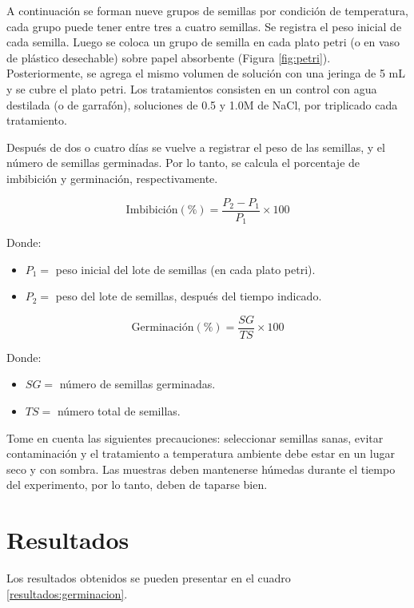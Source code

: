 A continuaci\'on se forman nueve grupos de semillas por condici\'on de temperatura, cada grupo puede tener entre tres a cuatro semillas. Se registra el peso inicial de cada semilla. Luego se coloca un grupo de semilla en cada plato petri (o en vaso de pl\'astico desechable) sobre papel absorbente (Figura \ref{fig:petri}). Posteriormente, se agrega el mismo volumen de soluci\'on con una jeringa de 5 mL y se cubre el plato petri. Los tratamientos consisten en un control con agua destilada (o de garraf\'on), soluciones de 0.5 y 1.0M de NaCl, por triplicado cada tratamiento. 

Despu\'es de dos o cuatro d\'ias se vuelve a registrar el peso de las semillas, y el n\'umero de semillas germinadas. Por lo tanto, se calcula el porcentaje de imbibici\'on y germinaci\'on, respectivamente.

$$\text{Imbibici\'on} (\%) = \frac{P_2 - P_1}{P_1} \times 100$$ 

Donde:

\begin{itemize}
	\item $P_1 =$ peso inicial del lote de semillas (en cada plato petri).
	\item $P_2 =$ peso del lote de semillas, despu\'es del tiempo indicado.
\end{itemize}

$$\text{Germinaci\'on} (\%) = \frac{SG}{TS} \times 100$$

Donde:

\begin{itemize}
	\item $SG =$ n\'umero de semillas germinadas.
	\item $TS =$ n\'umero total de semillas. 
\end{itemize}

Tome en cuenta las siguientes precauciones: seleccionar semillas sanas, evitar contaminaci\'on y el tratamiento a temperatura ambiente debe estar en un lugar seco y con sombra. Las muestras deben mantenerse h\'umedas durante el tiempo del experimento, por lo tanto, deben de taparse bien. 

\section{Resultados}

Los resultados obtenidos se pueden presentar en el cuadro \ref{resultados:germinacion}.

